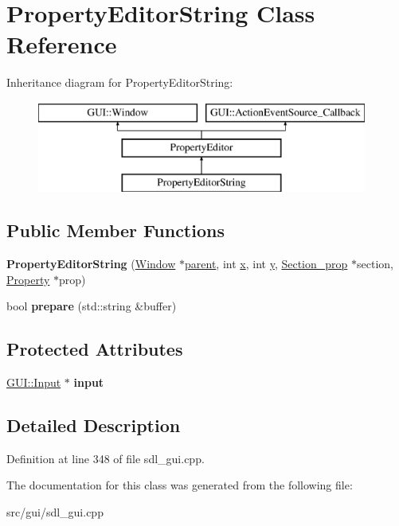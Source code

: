 \hypertarget{classPropertyEditorString}{\section{Property\-Editor\-String Class Reference}
\label{classPropertyEditorString}
}
Inheritance diagram for Property\-Editor\-String\-:\begin{figure}[H]
\begin{center}
\leavevmode
\includegraphics[height=3.000000cm]{classPropertyEditorString}
\end{center}
\end{figure}
\subsection*{Public Member Functions}
\begin{DoxyCompactItemize}
\item 
\hypertarget{classPropertyEditorString_a31b0d946bf3f3266c7c99db8c74e72c2}{{\bfseries Property\-Editor\-String} (\hyperlink{classGUI_1_1Window_ae828e9daa964dfc65a3550fb03117d30}{Window} $\ast$\hyperlink{classGUI_1_1Window_a2e593ff65e7702178d82fe9010a0b539}{parent}, int \hyperlink{classGUI_1_1Window_a6ca6a80ca00c9e1d8ceea8d3d99a657d}{x}, int \hyperlink{classGUI_1_1Window_a0ee8e923aff2c3661fc2e17656d37adf}{y}, \hyperlink{classSection__prop}{Section\-\_\-prop} $\ast$section, \hyperlink{classProperty}{Property} $\ast$prop)}\label{classPropertyEditorString_a31b0d946bf3f3266c7c99db8c74e72c2}

\item 
\hypertarget{classPropertyEditorString_a4653327f5d42f8b8146ecad5d1c9a53e}{bool {\bfseries prepare} (std\-::string \&buffer)}\label{classPropertyEditorString_a4653327f5d42f8b8146ecad5d1c9a53e}

\end{DoxyCompactItemize}
\subsection*{Protected Attributes}
\begin{DoxyCompactItemize}
\item 
\hypertarget{classPropertyEditorString_a01df4231c719d774740cc9dcb24682d5}{\hyperlink{classGUI_1_1Input}{G\-U\-I\-::\-Input} $\ast$ {\bfseries input}}\label{classPropertyEditorString_a01df4231c719d774740cc9dcb24682d5}

\end{DoxyCompactItemize}


\subsection{Detailed Description}


Definition at line 348 of file sdl\-\_\-gui.\-cpp.



The documentation for this class was generated from the following file\-:\begin{DoxyCompactItemize}
\item 
src/gui/sdl\-\_\-gui.\-cpp\end{DoxyCompactItemize}
